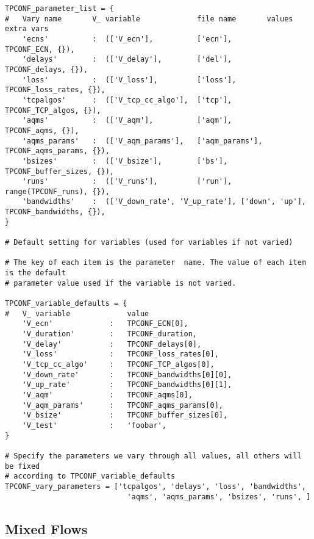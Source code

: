 \begin{code}
\begin{verbatim}
TPCONF_parameter_list = {
#   Vary name		V_ variable	            file name	    values      extra vars
    'ecns' 	        :  (['V_ecn'],	        ['ecn'], 	    TPCONF_ECN, {}),
    'delays' 	    :  (['V_delay'], 	    ['del'], 	    TPCONF_delays, {}),
    'loss'  	    :  (['V_loss'], 	    ['loss'],   	TPCONF_loss_rates, {}),
    'tcpalgos' 	    :  (['V_tcp_cc_algo'],  ['tcp'], 	    TPCONF_TCP_algos, {}),
    'aqms'	        :  (['V_aqm'], 	        ['aqm'], 	    TPCONF_aqms, {}),
    'aqms_params'   :  (['V_aqm_params'],   ['aqm_params'], TPCONF_aqms_params, {}),
    'bsizes'	    :  (['V_bsize'], 	    ['bs'], 	    TPCONF_buffer_sizes, {}),
    'runs'	        :  (['V_runs'],         ['run'], 	    range(TPCONF_runs), {}),
    'bandwidths'    :  (['V_down_rate', 'V_up_rate'], ['down', 'up'], TPCONF_bandwidths, {}),
}

# Default setting for variables (used for variables if not varied)

# The key of each item is the parameter  name. The value of each item is the default
# parameter value used if the variable is not varied.

TPCONF_variable_defaults = {
#   V_ variable			    value
    'V_ecn'  		    :	TPCONF_ECN[0],
    'V_duration'  	    :	TPCONF_duration,
    'V_delay'  		    :	TPCONF_delays[0],
    'V_loss'   		    :	TPCONF_loss_rates[0],
    'V_tcp_cc_algo' 	:	TPCONF_TCP_algos[0],
    'V_down_rate'   	:	TPCONF_bandwidths[0][0],
    'V_up_rate'	    	:	TPCONF_bandwidths[0][1],
    'V_aqm'	    	    :	TPCONF_aqms[0],
    'V_aqm_params'      :   TPCONF_aqms_params[0],
    'V_bsize'	    	:	TPCONF_buffer_sizes[0],
    'V_test'	    	:	'foobar',
}

# Specify the parameters we vary through all values, all others will be fixed
# according to TPCONF_variable_defaults
TPCONF_vary_parameters = ['tcpalgos', 'delays', 'loss', 'bandwidths',
                            'aqms', 'aqms_params', 'bsizes', 'runs', ]    
\end{verbatim}
\label{code:teacup-performance}
\end{code}






\subsection{Mixed Flows} \label{app:teacup-mixed}

